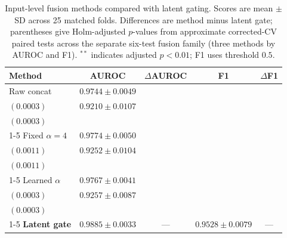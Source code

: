 \begin{table}[t]
\centering
\caption{Input-level fusion methods compared with latent gating. Scores are mean $\pm$ SD across 25 matched folds. Differences are method minus latent gate; parentheses give Holm-adjusted $p$-values from approximate corrected-CV paired tests across the separate six-test fusion family (three methods by AUROC and F1). $^{**}$ indicates adjusted $p<0.01$; F1 uses threshold $0.5$.}
\label{tab:fusion-methods}
\begin{tabular*}{\textwidth}{@{\extracolsep{\fill}}lcccc@{}}
\toprule
Method & AUROC & $\Delta$AUROC & F1 & $\Delta$F1 \\
\midrule
Raw concat & $0.9744\pm0.0049$ & \shortstack{$-0.01401^{**}$\\{\scriptsize $(0.0003)$}} & $0.9210\pm0.0107$ & \shortstack{$-0.03187^{**}$\\{\scriptsize $(0.0003)$}} \\
\cmidrule(lr){1-5}
Fixed $\alpha=4$ & $0.9774\pm0.0050$ & \shortstack{$-0.01111^{**}$\\{\scriptsize $(0.0011)$}} & $0.9252\pm0.0104$ & \shortstack{$-0.02765^{**}$\\{\scriptsize $(0.0011)$}} \\
\cmidrule(lr){1-5}
Learned $\alpha$ & $0.9767\pm0.0041$ & \shortstack{$-0.01180^{**}$\\{\scriptsize $(0.0003)$}} & $0.9257\pm0.0087$ & \shortstack{$-0.02710^{**}$\\{\scriptsize $(0.0003)$}} \\
\cmidrule(lr){1-5}
\textbf{Latent gate} & $\mathbf{0.9885\pm0.0033}$ & --- & $\mathbf{0.9528\pm0.0079}$ & --- \\
\bottomrule
\end{tabular*}
\end{table}
